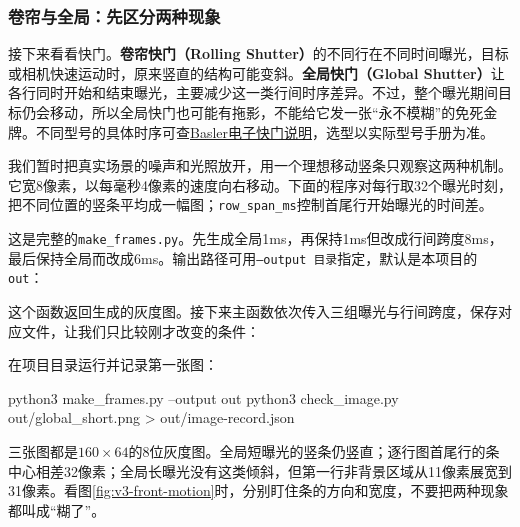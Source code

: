 \subsubsection{卷帘与全局：先区分两种现象}

接下来看看快门。\textbf{卷帘快门（Rolling Shutter）}的不同行在不同时间曝光，目标或相机快速运动时，原来竖直的结构可能变斜。\textbf{全局快门（Global Shutter）}让各行同时开始和结束曝光，主要减少这一类行间时序差异。不过，整个曝光期间目标仍会移动，所以全局快门也可能有拖影，不能给它发一张“永不模糊”的免死金牌。不同型号的具体时序可查\href{https://docs.baslerweb.com/electronic-shutter-types}{Basler电子快门说明}，选型以实际型号手册为准。

我们暂时把真实场景的噪声和光照放开，用一个理想移动竖条只观察这两种机制。它宽8像素，以每毫秒4像素的速度向右移动。下面的程序对每行取32个曝光时刻，把不同位置的竖条平均成一幅图；\texttt{row\_span\_ms}控制首尾行开始曝光的时间差。

\begin{example}
这是完整的\texttt{make\_frames.py}。先生成全局1ms，再保持1ms但改成行间跨度8ms，最后保持全局而改成6ms。输出路径可用\texttt{--output 目录}指定，默认是本项目的\texttt{out}：

\par\vspace{6pt}
\noindent\begin{minipage}[t]{\linewidth}

\end{minipage}\par\vspace{6pt}
这个函数返回生成的灰度图。接下来主函数依次传入三组曝光与行间跨度，保存对应文件，让我们只比较刚才改变的条件：

\par\vspace{6pt}
\noindent\begin{minipage}[t]{\linewidth}

\end{minipage}\par\vspace{6pt}
在项目目录运行并记录第一张图：
\begin{tbash}
python3 make_frames.py --output out
python3 check_image.py out/global_short.png > out/image-record.json
\end{tbash}
三张图都是$160\times64$的8位灰度图。全局短曝光的竖条仍竖直；逐行图首尾行的条中心相差32像素；全局长曝光没有这类倾斜，但第一行非背景区域从11像素展宽到31像素。看图\ref{fig:v3-front-motion}时，分别盯住条的方向和宽度，不要把两种现象都叫成“糊了”。
\end{example}

